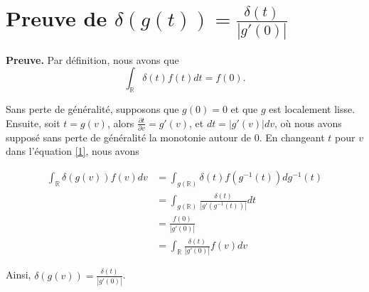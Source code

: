\documentclass[12pt]{article}
\title{}
\author{}
\date{}
\begin{document}
\maketitle
\tableofcontents
\newpage

\section{Preuve de \(\delta(g(t)) = \frac{\delta(t)}{|g'(0)|}\)}

\textbf{Preuve.} Par définition, nous avons que
\begin{equation}
\int_{\mathbb{R}} \delta(t)f(t)dt = f(0).
\end{equation}

Sans perte de généralité, supposons que \(g(0) = 0\) et que \(g\) est localement lisse. Ensuite, soit \(t = g(v)\), alors \(\frac{\partial t}{\partial v} = g'(v)\), et \(dt = |g'(v)|dv\), où nous avons supposé sans perte de généralité la monotonie autour de 0. En changeant \(t\) pour \(v\) dans l'équation \eqref{1}, nous avons

\begin{align}
\int_{\mathbb{R}} \delta(g(v))f(v)dv &= \int_{g(\mathbb{R})} \delta(t)f(g^{-1}(t))dg^{-1}(t) \\
&= \int_{g(\mathbb{R})} \frac{\delta(t)}{|g'(g^{-1}(t))|} dt \\
&= \frac{f(0)}{|g'(0)|} \\
&= \int_{\mathbb{R}} \frac{\delta(t)}{|g'(0)|} f(v)dv
\end{align}

Ainsi, \(\delta(g(v)) = \frac{\delta(t)}{|g'(0)|}\).
\hfill \qedsymbol
\end{document}
